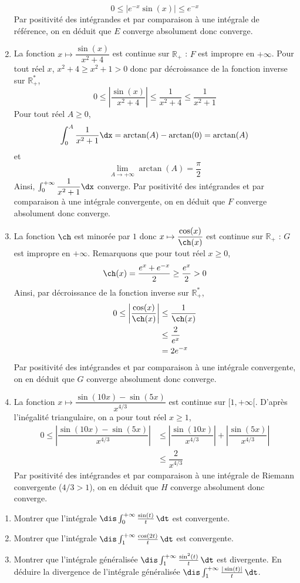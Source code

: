 \documentclass[a4paper,10pt]{report}
\begin{document}
\begin{enumerate}
$$ 0 \leq \vert  e^{-x} \sin(x)  \vert \leq e^{-x}$$
Par positivité des intégrandes et par comparaison à une intégrale de référence, on en déduit que $E$ converge absolument donc converge.
\item La fonction $x \mapsto \dfrac{\sin(x)}{x^2+4}$ est continue sur $\mathbb{R}_+$ : $F$ est impropre en $+ \infty$. Pour tout réel $x$, $x^2+4 \geq x^2+1>0$ donc par décroissance de la fonction inverse sur $\mathbb{R}_+^*$,
$$ 0 \leq \left\vert \dfrac{\sin(x)}{x^2+4} \right\vert \leq \dfrac{1}{x^2+4} \leq \dfrac{1}{x^2+1}$$
Pour tout réel $A \geq 0$,
$$ \int_0^A \dfrac{1}{x^2+1} \dx = \arctan(A)- \arctan(0)= \arctan(A)$$
et 
$$ \lim_{A \rightarrow + \infty} \arctan(A) = \dfrac{\pi}{2}$$
Ainsi, $\int_0^{+ \infty} \dfrac{1}{x^2+1} \dx$ converge. Par positivité des intégrandes et par comparaison à une intégrale convergente, on en déduit que $F$ converge absolument donc converge.
\item La fonction $\ch$ est minorée par $1$ donc $x \mapsto \dfrac{\cos(x)}{\ch(x)}$ est continue sur $\mathbb{R}_+$ : $G$ est impropre en $+ \infty$. Remarquons que pour tout réel $x \geq 0$,
$$ \ch(x) = \dfrac{e^x+e^{-x}}{2} \geq \dfrac{e^x}{2} >0$$
Ainsi, par décroissance de la fonction inverse sur $\mathbb{R}_+^*$,
\begin{align*}
0 \leq \left\vert \dfrac{\cos(x)}{\ch(x)} \right\vert & \leq \dfrac{1}{\ch(x)} \\
& \leq \dfrac{2}{e^x} \\
& = 2e^{-x}
\end{align*}
Par positivité des intégrandes et par comparaison à une intégrale convergente, on en déduit que $G$ converge absolument donc converge.
\item La fonction $x\mapsto  \dfrac{\sin(10x)-\sin(5x)}{x^{4/3}}$ est continue sur $[1, + \infty[$. D'après l'inégalité triangulaire, on a pour tout réel $x \geq 1$,
\begin{align*}
0 \leq \left\vert  \dfrac{\sin(10x)-\sin(5x)}{x^{4/3}} \right\vert & \leq \left\vert  \dfrac{\sin(10x)}{x^{4/3}} \right\vert + \left\vert  \dfrac{\sin(5x)}{x^{4/3}} \right\vert \\
& \leq \dfrac{2}{x^{4/3}}
\end{align*}
Par positivité des intégrandes et par comparaison à une intégrale de Riemann convergente ($4/3>1$), on en déduit que $H$ converge absolument donc converge.
\end{enumerate}

\begin{Exa} \begin{enumerate}
\item Montrer que l'int\'egrale $\dis \int_0^{+ \infty} \frac{\sin(t)}{t}\, \dt$ est convergente.
\item Montrer que l'int\'egrale $\dis \int_1^{+\infty}\frac{\cos(2t)}{t}\, \dt$ est convergente.
\item Montrer que l'int\'egrale g\'en\'eralis\'ee $\dis \int_1^{+\infty}\frac{\sin^2(t)}{t} \, \dt$ est divergente. En d\'eduire la divergence de l'int\'egrale g\'en\'eralis\'ee $\dis \int_1^{+\infty}\frac{|\sin(t)|}{t} \, \dt$.
\end{enumerate}
\end{Exa}
\end{document}
